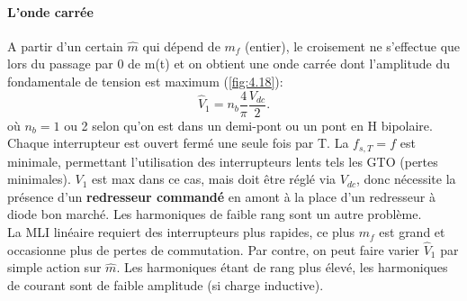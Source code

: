 		\paragraph{L'onde carrée}\quad A partir d'un certain $\hat{m}$ qui dépend de $m_f$ (entier), le croisement ne s'effectue que lors du passage par 0 de m(t) et on obtient une onde carrée dont l'amplitude du fondamentale de tension est maximum (\autoref{fig:4.18}):
		\begin{equation}
			\hat{V}_{1} = n_b \frac{4}{\pi}\frac{V_{dc}}{2}. 
		\end{equation}		  
		où $n_b = 1$ ou 2 selon qu'on est dans un demi-pont ou un pont en H bipolaire. Chaque interrupteur est ouvert fermé une seule fois par T. La $f_{s,T} = f$ est minimale, permettant l'utilisation des interrupteurs lents tels les GTO (pertes minimales). $V_1$ est max dans ce cas, mais doit être réglé via $V_{dc}$, donc nécessite la présence d'un \textbf{redresseur commandé} en amont à la place d'un redresseur à diode bon marché. Les harmoniques de faible rang sont un autre problème. \\
		
		La MLI linéaire requiert des interrupteurs plus rapides, ce plus $m_f$ est grand et occasionne plus de pertes de commutation. Par contre, on peut faire varier $\hat{V}_1$ par simple action sur $\hat{m}$. Les harmoniques étant de rang plus élevé, les harmoniques de courant sont de faible amplitude (si charge inductive). 
		
